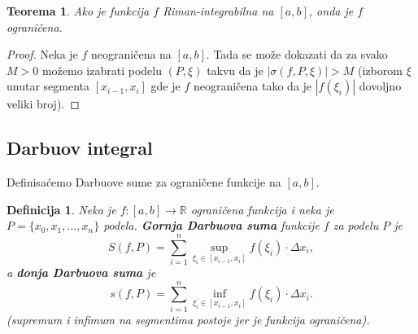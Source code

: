 \documentclass[a4paper,12pt,twoside]{report}
\newtheorem{theorem}{Teorema}[section]
\newtheorem{definition}{Definicija}[section]
\numberwithin{algorithm}{section}
\begin{document}
\begin{theorem}
    Ako je funkcija $f$ Riman-integrabilna na $[a, b]$, onda je $f$ ograničena.
\end{theorem}
\begin{proof}
    
     Neka je $f$ neograničena na $[a, b]$. Tada se može dokazati da za svako $M > 0$ možemo izabrati podelu $(P, \xi)$ takvu da je $|\sigma(f, P, \xi)| > M$ (izborom $\xi$ unutar segmenta $[x_{i-1}, x_i]$ gde je $f$ neograničena tako da je $|f(\xi_i)|$ dovoljno veliki broj).
    
\end{proof}
\subsection{Darbuov integral}

Definisaćemo Darbuove sume za ograničene funkcije na $[a, b]$.
\begin{definition}
    Neka je $f: [a, b] \to \mathbb{R}$ ograničena funkcija i neka je $P = \{x_0, x_1, \dots, x_n\}$ podela.
\textbf{Gornja Darbuova suma} funkcije $f$ za podelu $P$ je
\[
    S(f, P) = \sum_{i=1}^n \sup_{\xi_i \in [x_{i-1}, x_i]} f(\xi_i) \cdot \Delta x_i,
\]
a \textbf{donja Darbuova suma} je
\[
    s(f, P) = \sum_{i=1}^n \inf_{\xi_i \in [x_{i-1}, x_i]} f(\xi_i) \cdot \Delta x_i.
\]
(supremum i infimum na segmentima postoje jer je funkcija ograničena).

\end{definition}
\end{document}
